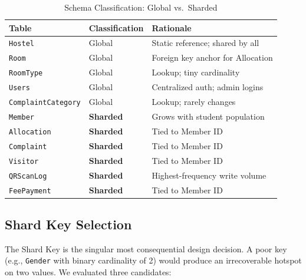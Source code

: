 \documentclass[sigconf]{acmart}
\newcommand{\theadbf}[1]{\textbf{#1}}
\begin{document}
\begin{table}[H]
\centering
\caption{Schema Classification: Global vs.\ Sharded}
\label{tab:schema-class}
\small
\renewcommand{\arraystretch}{1.3}
\begin{tabular}{|L{2.0cm}|L{2.4cm}|L{2.8cm}|}
\hline
{}\color{white}\theadbf{Table} & \color{white}\theadbf{Classification} & \color{white}\theadbf{Rationale} \\
\hline
{}\texttt{Hostel} & Global & Static reference; shared by all \\
\hline
\texttt{Room} & Global & Foreign key anchor for Allocation \\
\hline
{}\texttt{RoomType} & Global & Lookup; tiny cardinality \\
\hline
\texttt{Users} & Global & Centralized auth; admin logins \\
\hline
{}\texttt{ComplaintCategory} & Global & Lookup; rarely changes \\
\hline
\texttt{Member} & \textbf{Sharded} & Grows with student population \\
\hline
{}\texttt{Allocation} & \textbf{Sharded} & Tied to Member ID \\
\hline
\texttt{Complaint} & \textbf{Sharded} & Tied to Member ID \\
\hline
{}\texttt{Visitor} & \textbf{Sharded} & Tied to Member ID \\
\hline
\texttt{QRScanLog} & \textbf{Sharded} & Highest-frequency write volume \\
\hline
{}\texttt{FeePayment} & \textbf{Sharded} & Tied to Member ID \\
\hline
\end{tabular}
\end{table}

\subsection{Shard Key Selection}

The Shard Key is the singular most consequential design decision. A poor key (e.g., \texttt{Gender} with binary cardinality of 2) would produce an irrecoverable hotspot on two values. We evaluated three candidates:
\end{document}
